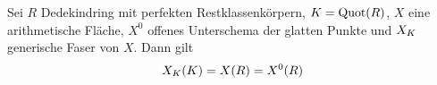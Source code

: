 \begin{Korollar}\label{thm:ratpkteregulaeremodelle}
  Sei $R$ Dedekindring
  mit perfekten Restklassenkörpern,
  $K=\operatorname{Quot}(R)$,
  $X$ eine arithmetische Fläche,
  $X^0$ offenes Unterschema der glatten Punkte und
  $X_{K}$ generische Faser von $X$.
  Dann gilt
  \begin{gather*}
    X_{K}(K)=X(R)=X^0(R)
  \end{gather*}


\end{Korollar}
